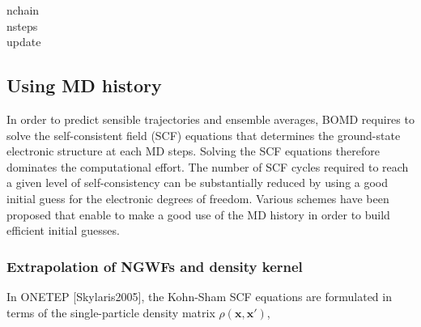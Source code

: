 \documentclass[letterpaper,10pt,english]{sphinxmanual}
\begin{document}
\begin{description}
\item[{nchain}] \leavevmode
{}

\item[{nsteps}] \leavevmode
{}

\item[{update}] \leavevmode
{}

\end{description}


\subsection{Using MD history}
\label{\detokenize{BOMD:using-md-history}}
In order to predict sensible trajectories and ensemble averages, BOMD
requires to solve the self-consistent field (SCF) equations that
determines the ground-state electronic structure at each MD steps.
Solving the SCF equations therefore dominates the computational effort.
The number of SCF cycles required to reach a given level of
self-consistency can be substantially reduced by using a good initial
guess for the electronic degrees of freedom. Various schemes have been
proposed that enable to make a good use of the MD history in order to
build efficient initial guesses.


\subsubsection{Extrapolation of NGWFs and density kernel}
\label{\detokenize{BOMD:extrapolation-of-ngwfs-and-density-kernel}}
In ONETEP {[}Skylaris2005{]}, the Kohn-Sham SCF equations
are formulated in terms of the single-particle density matrix
\(\rho(\mathbf{x},\mathbf{x'})\),
\end{document}
